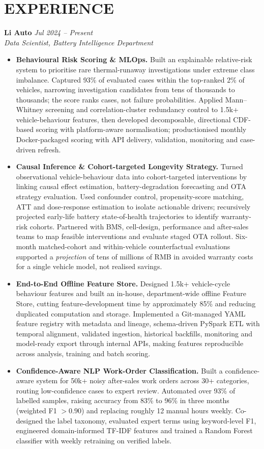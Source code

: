 \documentclass[a4paper,10pt]{article}
\begin{document}
\section{EXPERIENCE}
\textbf{Li Auto} \hfill \textit{Jul 2024 -- Present}\\
\textit{Data Scientist, Battery Intelligence Department}
\begin{itemize}
\item \textbf{Behavioural Risk Scoring \& MLOps.} Built an explainable relative-risk system to prioritise rare thermal-runaway investigations under extreme class imbalance. Captured 93\% of evaluated cases within the top-ranked 2\% of vehicles, narrowing investigation candidates from tens of thousands to thousands; the score ranks cases, not failure probabilities. Applied Mann--Whitney screening and correlation-cluster redundancy control to 1.5k+ vehicle-behaviour features, then developed decomposable, directional CDF-based scoring with platform-aware normalisation; productionised monthly Docker-packaged scoring with API delivery, validation, monitoring and case-driven refresh.
\item \textbf{Causal Inference \& Cohort-targeted Longevity Strategy.} Turned observational vehicle-behaviour data into cohort-targeted interventions by linking causal effect estimation, battery-degradation forecasting and OTA strategy evaluation. Used confounder control, propensity-score matching, ATT and dose-response estimation to isolate actionable drivers; recursively projected early-life battery state-of-health trajectories to identify warranty-risk cohorts. Partnered with BMS, cell-design, performance and after-sales teams to map feasible interventions and evaluate staged OTA rollout. Six-month matched-cohort and within-vehicle counterfactual evaluations supported a \emph{projection} of tens of millions of RMB in avoided warranty costs for a single vehicle model, not realised savings.
\item \textbf{End-to-End Offline Feature Store.} Designed 1.5k+ vehicle-cycle behaviour features and built an in-house, department-wide offline Feature Store, cutting feature-development time by approximately 85\% and reducing duplicated computation and storage. Implemented a Git-managed YAML feature registry with metadata and lineage, schema-driven PySpark ETL with temporal alignment, validated ingestion, historical backfills, monitoring and model-ready export through internal APIs, making features reproducible across analysis, training and batch scoring.
\item \textbf{Confidence-Aware NLP Work-Order Classification.} Built a confidence-aware system for 50k+ noisy after-sales work orders across 30+ categories, routing low-confidence cases to expert review. Automated over 93\% of labelled samples, raising accuracy from 83\% to 96\% in three months (weighted F1 $>0.90$) and replacing roughly 12 manual hours weekly. Co-designed the label taxonomy, evaluated expert terms using keyword-level F1, engineered domain-informed TF-IDF features and trained a Random Forest classifier with weekly retraining on verified labels.
\end{itemize}
\end{document}
